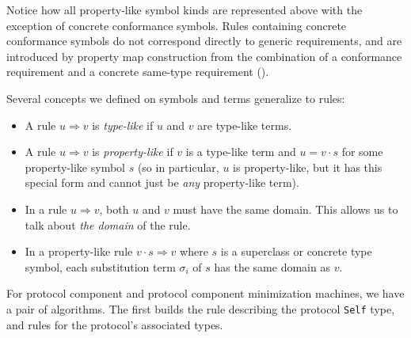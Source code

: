 \documentclass[../generics]{subfiles}
\begin{document}
Notice how all property-like symbol kinds are represented above with the exception of concrete conformance symbols. Rules containing concrete conformance symbols do not correspond directly to generic requirements, and are introduced by property map construction from the combination of a conformance requirement and a concrete same-type requirement ().
\begin{definition}\label{type like rule}
Several concepts we defined on symbols and terms generalize to rules:
\begin{itemize}
%
\item A rule $u\Rightarrow v$ is \emph{type-like} if $u$ and $v$ are type-like terms.
%
\item A rule $u\Rightarrow v$ is \emph{property-like} if $v$ is a type-like term and $u=v\cdot s$ for some property-like symbol $s$ (so in particular, $u$ is property-like, but it has this special form and cannot just be \emph{any} property-like term).
%
\item In a rule $u\Rightarrow v$, both $u$ and $v$ must have the same domain. This allows us to talk about \emph{the domain} of the rule.
\item In a property-like rule $v\cdot s\Rightarrow v$ where $s$ is a superclass or concrete type symbol, each substitution term $\sigma_i$ of $s$ has the same domain as $v$.
\end{itemize}
\end{definition}
For protocol component and protocol component minimization machines, we have a pair of algorithms. The first builds the rule describing the protocol \texttt{Self} type, and rules for the protocol's associated types.
\end{document}
